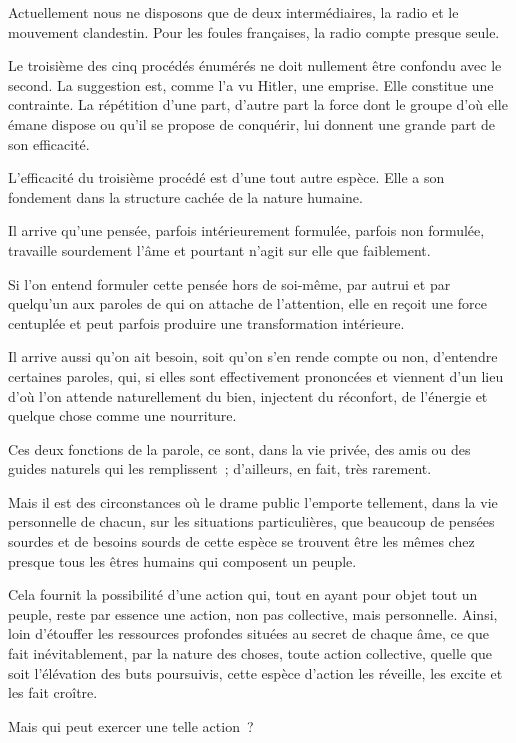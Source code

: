 \documentclass[french,twoside]{book} %
\begin{document}
Actuellement nous ne disposons que de deux intermédiaires, la radio et le mouvement clandestin. Pour les foules françaises, la radio compte presque seule.\par
Le troisième des cinq procédés énumérés ne doit nullement être confondu avec le second. La suggestion est, comme l'a vu Hitler, une emprise. Elle constitue une contrainte. La répétition d'une part, d'autre part la force dont le groupe d'où elle émane dispose ou qu'il se propose de conquérir, lui donnent une grande part de son efficacité.\par
L'efficacité du troisième procédé est d'une tout autre espèce. Elle a son fondement dans la structure cachée de la nature humaine.\par
Il arrive qu'une pensée, parfois intérieurement formulée, parfois non formulée, travaille sourdement l'âme et pourtant n'agit sur elle que faiblement.\par
Si l'on entend formuler cette pensée hors de soi-même, par autrui et par quelqu'un aux paroles de qui on attache de l'attention, elle en reçoit une force centuplée et peut parfois produire une transformation intérieure.\par
Il arrive aussi qu'on ait besoin, soit qu'on s'en rende compte ou non, d'entendre certaines paroles, qui, si elles sont effectivement prononcées et viennent d'un lieu d'où l'on attende naturellement du bien, injectent du réconfort, de l'énergie et quelque chose comme une nourriture.\par
Ces deux fonctions de la parole, ce sont, dans la vie privée, des amis ou des guides naturels qui les remplissent ; d'ailleurs, en fait, très rarement.\par
Mais il est des circonstances où le drame public l'emporte tellement, dans la vie personnelle de chacun, sur les situations particulières, que beaucoup de pensées sourdes et de besoins sourds de cette espèce se trouvent être les mêmes chez presque tous les êtres humains qui composent un peuple.\par
Cela fournit la possibilité d'une action qui, tout en ayant pour objet tout un peuple, reste par essence une action, non pas collective, mais personnelle. Ainsi, loin d'étouffer les ressources profondes situées au secret de chaque âme, ce que fait inévitablement, par la nature des choses, toute action collective, quelle que soit l'élévation des buts poursuivis, cette espèce d'action les réveille, les excite et les fait croître.\par
Mais qui peut exercer une telle action ?\par
\end{document}
